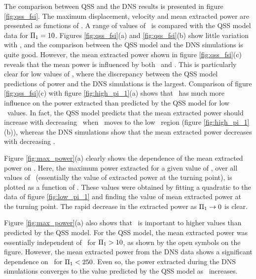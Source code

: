 The comparison between QSS and the DNS results is presented in figure \ref{fig:qss_fsi}. The maximum displacement, velocity and mean extracted power are presented as functions of \massdamp. A range of values of \massstiff\ is compared with the QSS model data for $\Pi_1 = 10$. Figures \ref{fig:qss_fsi}(a) and \ref{fig:qss_fsi}(b) show little variation with \massstiff, and the comparison between the QSS model and the DNS simulations is quite good. However, the mean extracted power shown in figure \ref{fig:qss_fsi}(c) reveals that the mean power is influenced by both \massstiff\ and \massdamp. This is particularly clear for low values of \massstiff, where the discrepancy between the QSS model predictions of power and the DNS simulations is the largest. Comparison of figure \ref{fig:qss_fsi}(c) with figure \ref{fig:high_pi_1}(a) shows that \massstiff\ has much more influence on the power extracted than predicted by the QSS model for low \massstiff \ values. In fact, the QSS model predicts that the mean extracted power should increase with decreasing \massstiff\ when \massstiff\ moves to the low \massstiff\ region (figure \ref{fig:high_pi_1}(b)), whereas the DNS simulations show that the mean extracted power decreases with decreasing \massstiff.



Figure \ref{fig:max_power}(a) clearly shows the dependence of the mean extracted power on \massstiff. Here, the maximum power extracted for a given value of \massstiff, over all values of \massdamp\ (essentially the value of extracted power at the turning point), is plotted as a function of \massstiff. These values were obtained by fitting a quadratic to the data of figure \ref{fig:low_pi_1} and finding the value of mean extracted power at the turning point. The rapid decrease in the extracted power as $\Pi_1 \rightarrow 0$ is clear.



Figure \ref{fig:max_power}(a) also shows that \massstiff\ is important to higher values than predicted by the QSS model. For the QSS model, the mean extracted power was essentially independent of \massstiff\ for $\Pi_1>10$, as shown by the open symbols on the figure. However, the mean extracted power from the DNS data shows a significant dependence on \massstiff\ for $\Pi_1<250$. Even so, the power extracted during the DNS simulations converges to the value predicted by the QSS model as \massstiff\ increases.

